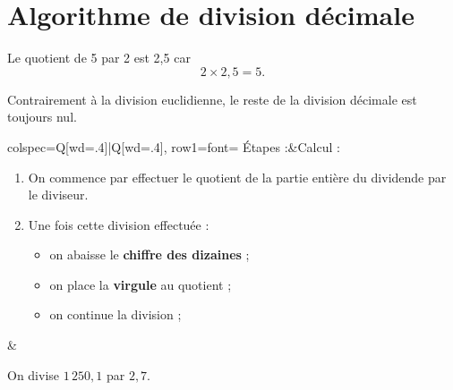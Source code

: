 \documentclass[../main.tex]{subfiles}
\begin{document}
    \part{Algorithme de division décimale}
        \begin{exemple}
            Le quotient de 5 par 2 est 2,5 car $$2\times2,5=5.$$
        \end{exemple}
        \begin{remarque}
            Contrairement à la division euclidienne, le reste de la division
            décimale est toujours nul.
        \end{remarque}
        \begin{center}
            \begin{tblr}{
                colspec={Q[wd=.4\linewidth]|Q[wd=.4\linewidth]},
                row{1}={font=\bfseries}
                }
                Étapes :&Calcul :\\
                \begin{enumerate}[1),font=\bfseries]
                    \item On commence par effectuer le quotient de la partie entière
                    du dividende par le diviseur.
                    \item Une fois cette division effectuée :
                    \begin{itemize}[$\bullet$]
                        \item on abaisse le \textbf{chiffre des dizaines} ;
                        \item on place la \textbf{virgule} au quotient ;
                        \item on continue la division ;
                    \end{itemize}
                \end{enumerate}
                &
                \medskip\par\noindent
                On divise $1\,250,1$ par $2,7$.
                \vspace{20pt}\par
            \end{tblr}
        \end{center}
    \newpage
\end{document}
